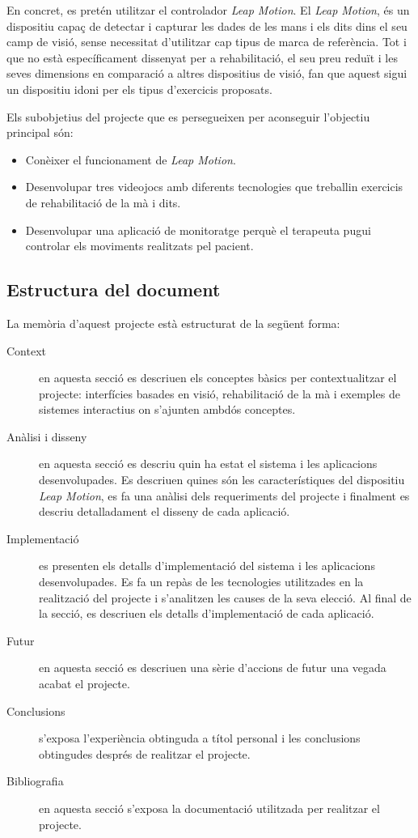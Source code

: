 \documentclass[12pt,a4paper,catalan]{article}
\begin{document}
	En concret, es pretén utilitzar el controlador \textit{Leap Motion}. El \textit{Leap Motion}, és un dispositiu capaç de detectar i capturar les dades de les mans i els dits dins el seu camp de visió, sense necessitat d'utilitzar cap tipus de marca de referència. Tot i que no està específicament dissenyat per a rehabilitació, el seu preu reduït i les seves dimensions en comparació a altres dispositius de visió, fan que aquest sigui un dispositiu idoni per els tipus d'exercicis proposats.
	
	Els subobjetius del projecte que es persegueixen per aconseguir l'objectiu principal són:
	\begin{itemize}
		\item Conèixer el funcionament de \textit{Leap Motion}.
		\item Desenvolupar tres videojocs amb diferents tecnologies que treballin exercicis de rehabilitació de la mà i dits.
		\item Desenvolupar una aplicació de monitoratge perquè el terapeuta pugui controlar els moviments realitzats pel pacient.
	\end{itemize}
	\subsection{Estructura del document}
	La memòria d'aquest projecte està estructurat de la següent forma:
	\begin{description}
		\item[Context] en aquesta secció es descriuen els conceptes bàsics per contextualitzar el projecte: interfícies basades en visió, rehabilitació de la mà i exemples de sistemes interactius on s'ajunten ambdós conceptes.
		\item[Anàlisi i disseny] en aquesta secció es descriu quin ha estat el sistema i les aplicacions desenvolupades. Es descriuen quines són les característiques del dispositiu \textit{Leap Motion}, es fa una anàlisi dels requeriments del projecte i finalment es descriu detalladament el disseny de cada aplicació.
		\item[Implementació] es presenten els detalls d'implementació del sistema i les aplicacions desenvolupades. Es fa un repàs de les tecnologies utilitzades en la realització del projecte i s'analitzen les causes de la seva elecció. Al final de la secció, es descriuen els detalls d'implementació de cada aplicació.
		\item[Futur] en aquesta secció es descriuen una sèrie d'accions de futur una vegada acabat el projecte.
		\item[Conclusions] s'exposa l'experiència obtinguda a títol personal i les conclusions obtingudes després de realitzar el projecte.
		\item[Bibliografia] en aquesta secció s'exposa la documentació utilitzada per realitzar el projecte.
	\end{description}
\end{document}
